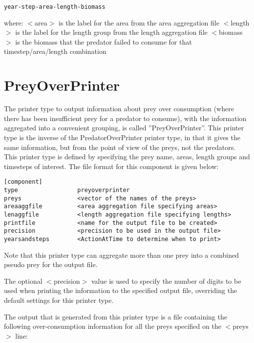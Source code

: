 \documentclass[10pt,twoside]{book}
\begin{document}
{\small\begin{verbatim}
year-step-area-length-biomass
\end{verbatim}}

where:\newline
$<$area$>$ is the label for the area from the area aggregation file\newline
$<$length$>$ is the label for the length group from the length aggregation file\newline
$<$biomass$>$ is the biomass that the predator failed to consume for that timestep/area/length combination

\section{PreyOverPrinter}\label{sec:preyoverprinter}
The printer type to output information about prey over consumption (where there has been insufficient prey for a predator to consume), with the information aggregated into a convenient grouping, is called ''PreyOverPrinter''.  This printer type is the inverse of the PredatorOverPrinter printer type, in that it gives the same information, but from the point of view of the preys, not the predators.  This printer type is defined by specifying the prey name, areas, length groups and timesteps of interest.  The file format for this component is given below:

{\small\begin{verbatim}
[component]
type                 preyoverprinter
preys                <vector of the names of the preys>
areaaggfile          <area aggregation file specifying areas>
lenaggfile           <length aggregation file specifying lengths>
printfile            <name for the output file to be created>
precision            <precision to be used in the output file>
yearsandsteps        <ActionAtTime to determine when to print>
\end{verbatim}}

Note that this printer type can aggregate more than one prey into a combined pseudo prey for the output file.

\bigskip
The optional $<$precision$>$ value is used to specify the number of digits to be used when printing the information to the specified output file, overriding the default settings for this printer type.

\bigskip
The output that is generated from this printer type is a file containing the following over-consumption information for all the preys specified on the $<$preys$>$ line:
\end{document}
